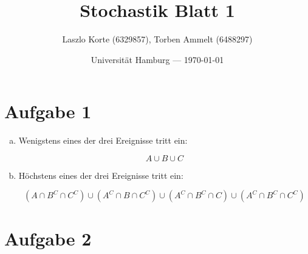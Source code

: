 \documentclass[parskip=half,a4paper]{scrartcl}
\title{Stochastik Blatt 1}
\author{Laszlo Korte (6329857), Torben Ammelt (6488297)}
\date{Universität Hamburg --- \today}
\begin{document}
\maketitle

\linenumbers

\section*{Aufgabe 1}

\begin{enumerate}[(a)]
\item Wenigstens eines der drei Ereignisse tritt ein:

$$
A \cup B \cup C
$$

\item Höchstens eines der drei Ereignisse tritt ein:

$$
(A \cap B^C \cap C^C) \cup
(A^C \cap B \cap C^C) \cup
(A^C \cap B^C \cap C) \cup
(A^C \cap B^C \cap C^C)
$$
\end{enumerate}

\section*{Aufgabe 2}
\end{document}

